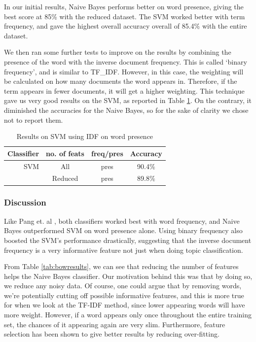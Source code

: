 \documentclass{article}
\begin{document}
In our initial results, Naive Bayes performs better on word presence, giving the best score at 85\% with the reduced dataset. The SVM worked better with term frequency, and gave the highest overall accuracy overall of 85.4\% with the entire dataset. 

We then ran some further tests to improve on the results by combining the presence of the word with the inverse document frequency. This is called `binary frequency', and is similar to TF\_IDF. However, in this case, the weighting will be calculated on how many documents the word appears in. Therefore, if the term appears in fewer documents, it will get a higher weighting. This technique gave us very good results on the SVM, as reported in Table \ref{tab:bowresults2}. On the contrary, it diminished the accuracies for the Naive Bayes, so for the sake of clarity we chose not to report them.

\begin{table}[ht!]
  \centering
  \begin{tabular}{ r | c | c | c }
    Classifier & no. of feats & freq/pres & Accuracy \\
	\hline \hline
		SVM & All & pres & 90.4\% \\
		& Reduced & pres & 89.8\% \\
		\hline
  \end{tabular}
  \caption{Results on SVM using IDF on word presence}
  \label{tab:bowresults2}
\end{table}

\subsubsection{Discussion}
Like Pang et. al \cite{pangetal}, both classifiers worked best with word frequency, and Naive Bayes outperformed SVM on word presence alone. Using binary frequency also boosted the SVM's performance drastically, suggesting that the inverse document frequency is a very informative feature not just when doing topic classification. 

From Table \ref{tab:bowresults}, we can see that reducing the number of features helps the Naive Bayes classifier. Our motivation behind this was that by doing so, we reduce any noisy data. Of course, one could argue that by removing words, we're potentially cutting off possible informative features, and this is more true for when we look at the TF-IDF method, since lower appearing words will have more weight. However, if a word appears only once throughout the entire training set, the chances of it appearing again are very slim. Furthermore, feature selection has been shown to give better results by reducing over-fitting. 
\end{document}

